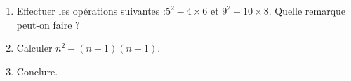 
\begin{enumerate}
\item Effectuer les opérations suivantes :$5^2-4\times 6$ \quad et \quad $9^2-10 \times 8$. Quelle remarque peut-on faire ?
\item Calculer $n^2-(n+1) (n-1)$.
\item Conclure.
\end{enumerate}
